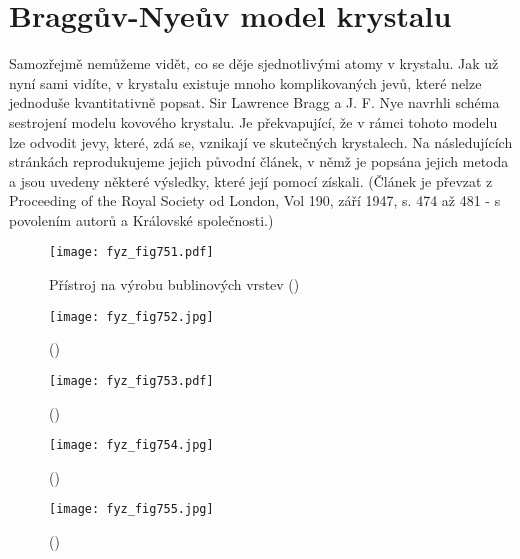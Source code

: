   \section{Braggův-Nyeův model krystalu}\label{fyz:IIchapXXXsecIX}
    Samozřejmě nemůžeme vidět, co se děje sjednotlivými atomy v krystalu. Jak už nyní sami vidíte, 
    v krystalu existuje mnoho komplikovaných jevů, které nelze jednoduše kvantitativně popsat. Sir 
    Lawrence Bragg a J. F. Nye navrhli schéma sestrojení modelu kovového krystalu. Je překvapující, 
    že v rámci tohoto modelu lze odvodit jevy, které, zdá se, vznikají ve skutečných krystalech. Na 
    následujících stránkách reprodukujeme jejich původní článek, v němž je popsána jejich metoda a 
    jsou uvedeny některé výsledky, které její pomocí získali. (Článek je převzat z Proceeding of 
    the Royal Society od London, Vol 190, září 1947, s. 474 až 481 - s povolením autorů a Královské 
    společnosti.)

    \begin{figure}[ht!] %
      \centering
      \texttt{[image: fyz\_fig751.pdf]}
      \caption{Přístroj na výrobu bublinových vrstev
               (\cite[s.~557]{Feynman02})}
      \label{fyz_fig751}
    \end{figure}

    \begin{figure}[ht!] %
      \centering
      \texttt{[image: fyz\_fig752.jpg]}
      \caption{
               (\cite[s.~707]{Feynman02})}
      \label{fyz_fig752}
    \end{figure}

    \begin{figure}[ht!] %
      \centering
      \texttt{[image: fyz\_fig753.pdf]}
      \caption{
               (\cite[s.~707]{Feynman02})}
      \label{fyz_fig753}
    \end{figure}



    \begin{figure}[ht!] %
      \centering
      \texttt{[image: fyz\_fig754.jpg]}
      \caption{
               (\cite[s.~707]{Feynman02})}
      \label{fyz_fig754}
    \end{figure}

    \begin{figure}[ht!] %
      \centering
      \texttt{[image: fyz\_fig755.jpg]}
      \caption{
               (\cite[s.~707]{Feynman02})}
      \label{fyz_fig755}
    \end{figure}

